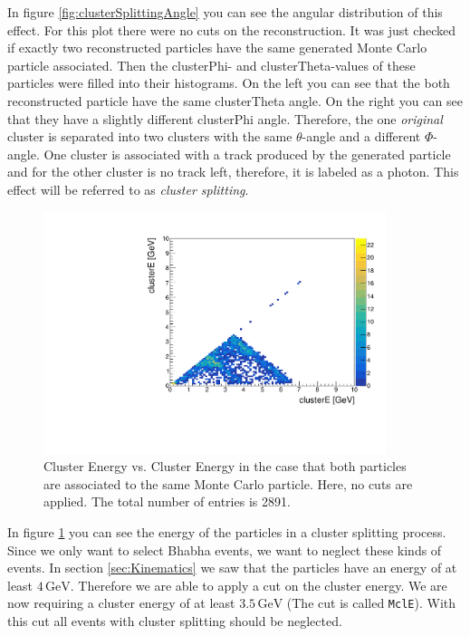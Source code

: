 \documentclass[a4paper,11pt,twosided,final,german,openbib,pdftex,listof=totoc,bibliography=totoc]{scrbook}
\begin{document}
In figure \ref{fig:clusterSplittingAngle} you can see the angular distribution of this effect. For this plot there were no cuts on the reconstruction. It was just checked if exactly two reconstructed particles have the same generated Monte Carlo particle associated. Then the clusterPhi- and clusterTheta-values of these particles were filled into their histograms. On the left you can see that the both reconstructed particle have the same clusterTheta angle. On the right you can see that they have a slightly different clusterPhi angle. Therefore, the one \textit{original} cluster  is separated into two clusters with the same $\theta$-angle and a different $\Phi$-angle. One cluster is associated with a track produced by the generated particle and for the other cluster is no track left, therefore, it is labeled as a photon. This effect will be referred to as \textit{cluster splitting}.





\begin{figure}[h!]
	\centering
	\includegraphics[width=10cm]{AnhangPlots/EEdoubleMCE}
	\caption[Cluster Splitting Energy Distribution]{Cluster Energy vs. Cluster Energy in the case that both particles are associated to the same Monte Carlo particle. Here, no cuts are applied. The total number of entries is 2891.}
	\label{fig:clusterSplittingE}
\end{figure}

In figure \ref{fig:clusterSplittingE} you can see the energy of the particles in a cluster splitting process. Since we only want to select Bhabha events, we want to neglect these kinds of events. In section \ref{sec:Kinematics} we saw that the particles have an energy of at least $4\,\textrm{GeV}$. Therefore we are able to apply a cut on the cluster energy. We are now requiring a cluster energy of at least $3.5\,\textrm{GeV}$ (The cut is called \texttt{MclE}). With this cut all events with cluster splitting should be neglected.
\end{document}
